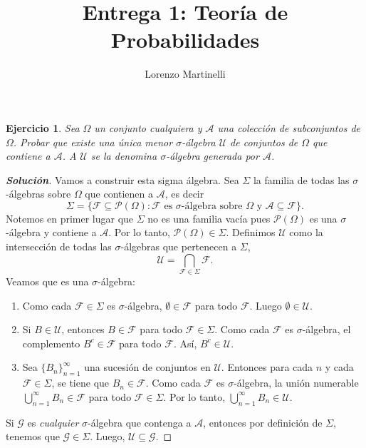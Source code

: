 \documentclass[11pt]{article}
\title{\Huge Entrega 1: Teoría de Probabilidades}
\author{Lorenzo Martinelli}
\theoremstyle{ejstyle}
\newtheorem{ejercicio}{Ejercicio}
\newenvironment{solucion}
{\begin{proof}[{\bfseries\color{deepindigo} Solución}]}
	{\end{proof}}
\begin{document}
	
	\maketitle
	
	
	\begin{ejercicio}
		Sea $\Omega$ un conjunto cualquiera y $\mathcal{A}$ una colección de subconjuntos de $\Omega$. Probar que existe una única menor $\sigma$-álgebra $\mathcal{U}$ de conjuntos de $\Omega$ que contiene a $\mathcal{A}$. A $\mathcal{U}$ se la denomina $\sigma$-álgebra generada por $\mathcal{A}$.
	\end{ejercicio}
	
	\begin{solucion}
		Vamos a construir esta sigma álgebra. Sea $\Sigma$ la familia de todas las $\sigma$-álgebras sobre $\Omega$ que contienen a $\mathcal{A}$, es decir
		$$ \Sigma = \{ \mathcal{F} \subseteq \mathcal{P}(\Omega) : \mathcal{F} \text{ es } \sigma\text{-álgebra sobre } \Omega \text{ y } \mathcal{A} \subseteq \mathcal{F} \}.$$
		Notemos en primer lugar que $\Sigma$ no es una familia vacía pues $\mathcal{P}(\Omega)$ es una $\sigma$-álgebra y contiene a $\mathcal{A}$. Por lo tanto, $\mathcal{P}(\Omega) \in \Sigma$. Definimos $\mathcal{U}$ como la intersección de todas las $\sigma$-álgebras que pertenecen a $\Sigma$,
		$$ \mathcal{U} = \bigcap_{\mathcal{F} \in \Sigma} \mathcal{F}.$$
		Veamos que es una $\sigma$-álgebra:
			\begin{enumerate}
				\item Como cada $\mathcal{F} \in \Sigma$ es $\sigma$-álgebra, $\emptyset \in \mathcal{F}$ para todo $\mathcal{F}$. Luego $\emptyset \in \mathcal{U}$.
				\item Si $B \in \mathcal{U}$, entonces $B \in \mathcal{F}$ para todo $\mathcal{F} \in \Sigma$. Como cada $\mathcal{F}$ es $\sigma$-álgebra, el complemento $B^c \in \mathcal{F}$ para todo $\mathcal{F}$. Así, $B^c \in \mathcal{U}$.
				\item Sea $\{B_n\}_{n=1}^\infty$ una sucesión de conjuntos en $\mathcal{U}$. Entonces para cada $n$ y cada $\mathcal{F} \in \Sigma$, se tiene que $B_n \in \mathcal{F}$. Como cada $\mathcal{F}$ es $\sigma$-álgebra, la unión numerable $\bigcup_{n=1}^\infty B_n \in \mathcal{F}$ para todo $\mathcal{F} \in \Sigma$. Por lo tanto, $\bigcup_{n=1}^\infty B_n \in \mathcal{U}$.
			\end{enumerate}
		Si $\mathcal{G}$ es \textit{cualquier} $\sigma$-álgebra que contenga a $\mathcal{A}$, entonces por definición de $\Sigma$, tenemos que $\mathcal{G} \in \Sigma$. Luego, $\mathcal{U} \subseteq \mathcal{G}$.

	\end{solucion}
	
\end{document}
